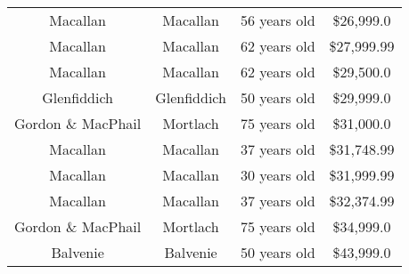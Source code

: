 \begin{appendices}
\begin{center}
\begin{tabular}{||c | c | c | c  ||}
Macallan & Macallan & 56 years old & \$26,999.0\\
Macallan & Macallan & 62 years old & \$27,999.99\\
Macallan & Macallan & 62 years old & \$29,500.0\\
Glenfiddich & Glenfiddich & 50 years old & \$29,999.0\\
Gordon \& MacPhail & Mortlach & 75 years old & \$31,000.0\\
Macallan & Macallan & 37 years old & \$31,748.99\\
Macallan & Macallan & 30 years old & \$31,999.99\\
Macallan & Macallan & 37 years old & \$32,374.99\\
Gordon \& MacPhail & Mortlach & 75 years old & \$34,999.0\\
Balvenie & Balvenie & 50 years old & \$43,999.0\\
\hline
\end{tabular}
\label{table:2}
\end{center}

\end{appendices}